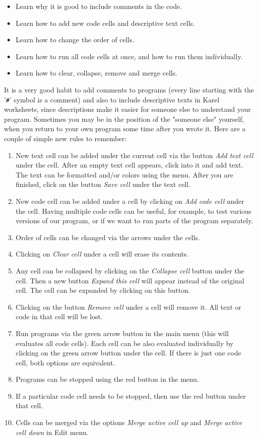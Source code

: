 \begin{itemize}
\item Learn why it is good to include comments in the code.
\item Learn how to add new code cells and descriptive text cells.
\item Learn how to change the order of cells.
\item Learn how to run all code cells at once, and how to run them individually.
\item Learn how to clear, collapse, remove and merge cells.
\end{itemize}
It is a very good habit to add comments to programs (every line starting with the '{\tt \#}'
symbol is a comment) and also to include descriptive 
texts in Karel worksheets, since descriptions make it easier for someone else to 
understand your program. Sometimes you may be in the position of the "someone else" yourself,
when you return to your own program some time after you wrote it. Here are a couple of 
simple new rules to remember:
\begin{enumerate} 
\item New text cell can be added under the current cell via the button 
      {\em Add text cell} under the cell. 
      After an empty text cell appears, click into it and add text. The text can be 
      formatted and/or colors using the menu. After you are finished, click 
      on the button {\em Save cell} under the text cell. 
\item New code cell can be added under a cell by clicking on {\em Add code cell} 
      under the cell. Having multiple code cells can be useful, for example, to test various versions 
      of our program, or if we want to run parts of the program separately. 
\item Order of cells can be changed via the arrows under the cells.
\item Clicking on {\em Clear cell} under a cell will erase its contents.
\item Any cell can be collapsed by clicking on the {\em Collapse cell} button
      under the cell. Then a new button {\em Expand this cell} will appear instead
      of the original cell. The cell can be expanded by clicking on this button.
\item Clicking on the button {\em Remove cell} under a cell will remove it. 
      All text or code in that cell will be lost.
\item Run programs via the green arrow button in the main menu (this will evaluates all code
      cells). Each cell can be also evaluated individually by clicking on the green 
      arrow button under the cell. If there is just one code cell, both options 
      are equivalent.
\item Programs can be stopped using the red button in the menu. 
\item If a particular
      code cell needs to be stopped, then use the red button under that cell.
\item Cells can be merged via the options {\em Merge active cell up} and 
      {\em Merge active cell down} in Edit menu.
\end{enumerate}

